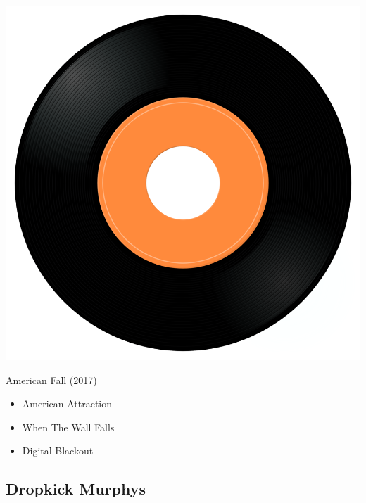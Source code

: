 \begin{minipage}[t]{0.25\textwidth}\vspace{0pt}
\captionsetup{type=figure}
\includegraphics[width=\textwidth]{Images/cover.png}
\caption*{American Fall (2017)}
\end{minipage}
\begin{minipage}[t]{0.25\textwidth}\vspace{0pt}
\begin{itemize}[nosep,leftmargin=1em,labelwidth=*,align=left]
	\setlength{\itemsep}{0pt}
	\item American Attraction
	\item When The Wall Falls
	\item Digital Blackout
\end{itemize}
\end{minipage}

\subsection{Dropkick Murphys}

